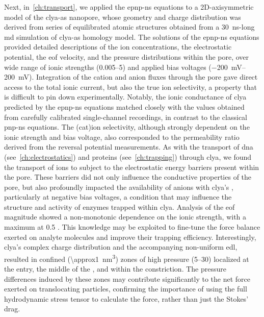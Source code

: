 Next, in~\cref{ch:transport}, we applied the \gls{epnp-ns} equations to a 2D-axisymmetric model of the
\gls{clya-as} nanopore, whose geometry and charge distribution was derived from series of equilibrated atomic
structures obtained from a \SI{30}{\ns}-long \gls{md} simulation of \gls{clya-as} homology model. The
solutions of the \gls{epnp-ns} equations provided detailed descriptions of the ion concentrations, the
electrostatic potential, the \gls{eof} velocity, and the pressure distributions within the pore, over wide
range of ionic strengths (\SIrange{0.005}{5}{\Molar}) and applied bias voltages (\SIrange{-200}{+200}{\mV}).
Integration of the cation and anion fluxes through the pore gave direct access to the total ionic current, but
also the true ion selectivity, a property that is difficult to pin down experimentally. Notably, the ionic
conductance of \gls{clya} predicted by the \gls{epnp-ns} equations matched closely with the values obtained
from carefully calibrated single-channel recordings, in contrast to the classical \gls{pnp-ns} equations. The
(cat)ion selectivity, although strongly dependent on the ionic strength and bias voltage, also corresponded to
the permeability ratio derived from the reversal potential measurements. As with the transport of \gls{dna}
(see~\cref{ch:electrostatics}) and proteins (see~\cref{ch:trapping}) through \gls{clya}, we found the
transport of ions to subject to the electrostatic energy barriers present within the pore. These barriers did
not only influence the conductive properties of the pore, but also profoundly impacted the availability of
anions with \gls{clya}'s \lumen{}, particularly at negative bias voltages, a condition that may influence the
structure and activity of enzymes trapped within \gls{clya}. Analysis of the \gls{eof} magnitude showed a
non-monotonic dependence on the ionic strength, with a maximum at \SI{0.5}{\Molar} . This knowledge
may be exploited to fine-tune the force balance exerted on analyte molecules and improve their trapping
efficiency. Interestingly, \gls{clya}'s complex charge distribution and the accompanying non-uniform
\gls{edl}, resulted in confined (\SI{\approx1}{\cubic\nm}) zones of high pressure (\SIrange{5}{30}{\atm})
localized at the \cisi{} entry, the middle of the \lumen{}, and within the \transi{} constriction. The
pressure differences induced by these zones may contribute significantly to the net force exerted on
translocating particles, confirming the importance of using the full hydrodynamic stress tensor to calculate
the force, rather than just the Stokes' drag.

